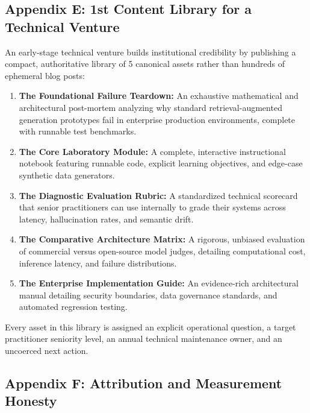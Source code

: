 \subsection*{Appendix E: 1st Content Library for a Technical Venture}

An early-stage technical venture builds institutional credibility by publishing a compact, authoritative library of 5 canonical assets rather than hundreds of ephemeral blog posts:
\begin{enumerate}[leftmargin=*,itemsep=1pt]
  \item \textbf{The Foundational Failure Teardown:} An exhaustive mathematical and architectural post-mortem analyzing why standard retrieval-augmented generation prototypes fail in enterprise production environments, complete with runnable test benchmarks.
  \item \textbf{The Core Laboratory Module:} A complete, interactive instructional notebook featuring runnable code, explicit learning objectives, and edge-case synthetic data generators.
  \item \textbf{The Diagnostic Evaluation Rubric:} A standardized technical scorecard that senior practitioners can use internally to grade their systems across latency, hallucination rates, and semantic drift.
  \item \textbf{The Comparative Architecture Matrix:} A rigorous, unbiased evaluation of commercial versus open-source model judges, detailing computational cost, inference latency, and failure distributions.
  \item \textbf{The Enterprise Implementation Guide:} An evidence-rich architectural manual detailing security boundaries, data governance standards, and automated regression testing.
\end{enumerate}

Every asset in this library is assigned an explicit operational question, a target practitioner seniority level, an annual technical maintenance owner, and an uncoerced next action.

\subsection*{Appendix F: Attribution and Measurement Honesty}

